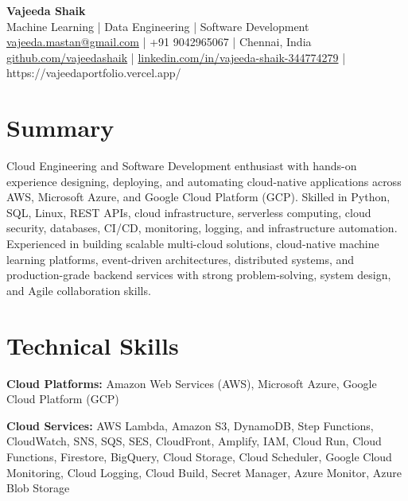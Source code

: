 \documentclass[9pt]{article}
\begin{document}
\begin{center}
    {\Large \textbf{Vajeeda Shaik}} \\[5pt]
   Machine Learning | Data Engineering | Software Development \\[5pt]
    \href{mailto:vajeeda.mastan@gmail.com}{vajeeda.mastan@gmail.com} \;|\;
    +91 9042965067 \;|\;
    Chennai, India \\[4pt]
    \href{https://github.com/vajeedashaik}{github.com/vajeedashaik} \;|\;
    \href{https://www.linkedin.com/in/vajeeda-shaik-344774279/}{linkedin.com/in/vajeeda-shaik-344774279} \;|\;
    https://vajeedaportfolio.vercel.app/
\end{center}

\section*{Summary}

Cloud Engineering and Software Development enthusiast with hands-on experience designing, deploying, and automating cloud-native applications across AWS, Microsoft Azure, and Google Cloud Platform (GCP). Skilled in Python, SQL, Linux, REST APIs, cloud infrastructure, serverless computing, cloud security, databases, CI/CD, monitoring, logging, and infrastructure automation. Experienced in building scalable multi-cloud solutions, cloud-native machine learning platforms, event-driven architectures, distributed systems, and production-grade backend services with strong problem-solving, system design, and Agile collaboration skills.



\section*{Technical Skills}

\textbf{Cloud Platforms:} Amazon Web Services (AWS), Microsoft Azure, Google Cloud Platform (GCP)

\textbf{Cloud Services:} AWS Lambda, Amazon S3, DynamoDB, Step Functions, CloudWatch, SNS, SQS, SES, CloudFront, Amplify, IAM, Cloud Run, Cloud Functions, Firestore, BigQuery, Cloud Storage, Cloud Scheduler, Google Cloud Monitoring, Cloud Logging, Cloud Build, Secret Manager, Azure Monitor, Azure Blob Storage
\end{document}
